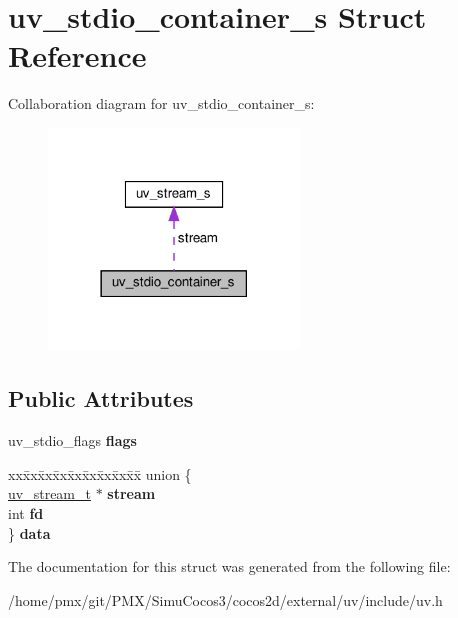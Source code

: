 \hypertarget{structuv__stdio__container__s}{}\section{uv\+\_\+stdio\+\_\+container\+\_\+s Struct Reference}
\label{structuv__stdio__container__s}


Collaboration diagram for uv\+\_\+stdio\+\_\+container\+\_\+s\+:
\nopagebreak
\begin{figure}[H]
\begin{center}
\leavevmode
\includegraphics[width=189pt]{structuv__stdio__container__s__coll__graph}
\end{center}
\end{figure}
\subsection*{Public Attributes}
\begin{DoxyCompactItemize}
\item 
\mbox{\label{structuv__stdio__container__s_ab1463185a7d7fe860c997fc70cb9041a}} 
uv\+\_\+stdio\+\_\+flags {\bfseries flags}
\item 
\mbox{\label{structuv__stdio__container__s_a6cfebaa95e0cff4e1ac40bcc285e88bc}} 
\begin{tabbing}
xx\=xx\=xx\=xx\=xx\=xx\=xx\=xx\=xx\=\kill
union \{\\
\>\hyperlink{structuv__stream__s}{uv\_stream\_t} $\ast$ {\bfseries stream}\\
\>int {\bfseries fd}\\
\} {\bfseries data}\\

\end{tabbing}\end{DoxyCompactItemize}


The documentation for this struct was generated from the following file\+:\begin{DoxyCompactItemize}
\item 
/home/pmx/git/\+P\+M\+X/\+Simu\+Cocos3/cocos2d/external/uv/include/uv.\+h\end{DoxyCompactItemize}
